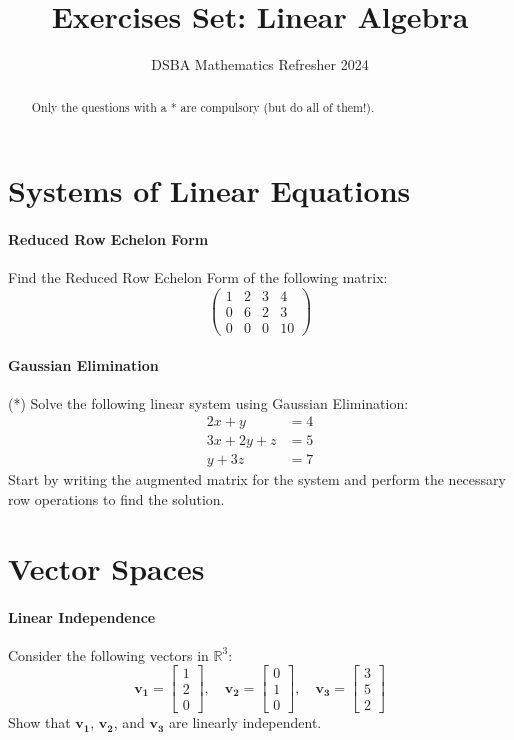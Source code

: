 \documentclass[]{article}
\title{Exercises Set: Linear Algebra}
\author{DSBA Mathematics Refresher 2024}
\date{}
\begin{document}
	
	\maketitle
	
	\begin{abstract}
		Only the questions with a * are compulsory (but do all of them!).
	\end{abstract}
	
	\section{Systems of Linear Equations}
	\paragraph{Reduced Row Echelon Form}
	Find the Reduced Row Echelon Form of the following matrix:
	$$\begin{pmatrix}
		1 & 2 & 3 & 4\\
		0 & 6 & 2 & 3\\
		0 & 0 & 0 & 10
	\end{pmatrix}$$
	
	\paragraph{Gaussian Elimination}
	(*) Solve the following linear system using Gaussian Elimination:
	\begin{align*}
		2x + y &= 4 \\
		3x + 2y + z &= 5 \\
		y + 3z &= 7
	\end{align*}
	Start by writing the augmented matrix for the system and perform the necessary row operations to find the solution.
	
	
	\section{Vector Spaces}
	\paragraph{Linear Independence}
	Consider the following vectors in $\mathbb{R}^3$:
	$$
	\mathbf{v_1} = \begin{bmatrix}
		1 \\
		2 \\
		0
	\end{bmatrix}, \quad
	\mathbf{v_2} = \begin{bmatrix}
		0 \\
		1 \\
		0
	\end{bmatrix}, \quad
	\mathbf{v_3} = \begin{bmatrix}
		3 \\
		5 \\
		2
	\end{bmatrix}
	$$
	Show that $\mathbf{v_1}$, $\mathbf{v_2}$, and $\mathbf{v_3}$ are linearly independent.
	
\end{document}

